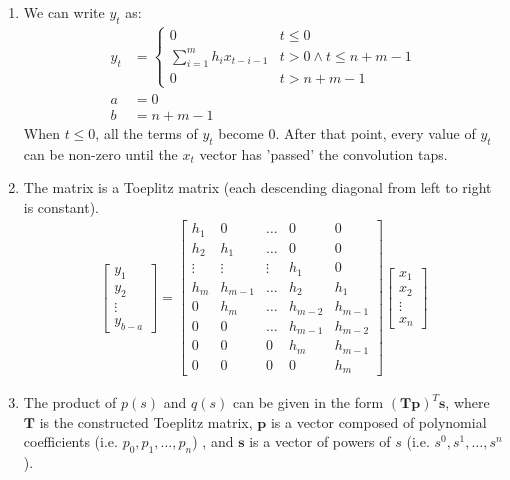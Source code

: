 \documentclass[11pt]{article}
\begin{document}
\begin{solution}
\begin{enumerate}
\item We can write $y_t$ as:
\begin{align*}
    y_t &= \begin{cases}
        0 & t \leq 0 \\
        \sum_{i=1}^{m} h_i x_{t-i-1} & t > 0 \land t \leq n + m - 1 \\
        0 & t > n + m - 1
    \end{cases} \\
    a &= 0 \\
    b &= n + m - 1
\end{align*}
When $t \leq 0$, all the terms of $y_t$ become 0. After that point, every value of $y_t$ can be non-zero until the $x_t$ vector has 'passed' the convolution taps.

\item The matrix is a Toeplitz matrix (each descending diagonal from left to right is constant).
\begin{align*}
    \begin{bmatrix}
        y_1 \\ y_2 \\ \vdots \\ y_{b-a}
    \end{bmatrix}
    =
    \begin{bmatrix}
        h_1 & 0 & \dots & 0 & 0 \\
        h_2 & h_1 & \dots & 0 & 0 \\
        \vdots & \vdots & \vdots & h_1 & 0 \\
        h_{m} & h_{m-1} & \dots & h_2 & h_1 \\
        0 & h_m & \dots & h_{m-2} & h_{m-1} \\
        0 & 0 & \dots & h_{m-1} & h_{m-2} \\
        0 & 0 & 0 & h_{m} & h_{m-1} \\
        0 & 0 & 0 & 0 & h_m
    \end{bmatrix}
    \begin{bmatrix}
        x_1 \\ x_2 \\ \vdots \\ x_n
    \end{bmatrix}
\end{align*}

\item The product of $p(s)$ and $q(s)$ can be given in the form $(\mathbf{T} \mathbf{p})^T \mathbf{s}$, where $\mathbf{T}$ is the constructed Toeplitz matrix, $\mathbf{p}$ is a vector composed of polynomial coefficients (i.e. $p_0, p_1, \dots, p_n$) , and $\mathbf{s}$ is a vector of powers of $s$ (i.e. $s^0, s^1, \dots, s^n$).


\end{enumerate}
\end{solution}
\end{document}
